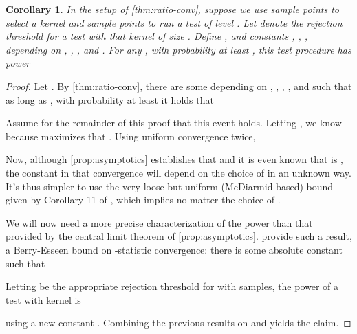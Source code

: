 \documentclass{article}
\newtheorem{corollary}[theorem]{Corollary} \crefname{corollary}{Corollary}{Corollaries}
\begin{document}
\begin{corollary} \label{thm:opt-power}
    In the setup of \cref{thm:ratio-conv},
    suppose we use  sample points to select a kernel 
    and  sample points to run a test of level .
    Let  denote the rejection threshold for a test with that kernel of size .
Define
    ,
    and constants , , ,  depending on , , ,  and .
    For any ,
    with probability at least ,
    this test procedure has power
    
\end{corollary}
\begin{proof}
    Let .
    By \cref{thm:ratio-conv},
    there are some  depending on , , , , and 
    such that as long as ,
    with probability at least  it holds that
    
    Assume for the remainder of this proof that this event holds.
    Letting ,
    we know because  maximizes  that .
Using uniform convergence twice,
    

    Now, although
    \cref{prop:asymptotics} establishes that  
    and it is even known \citep[Theorem 5]{Korolyuk1988} that
     is ,
the constant in that convergence will depend on the choice of  in an unknown way.
    It's thus simpler to use the very loose but uniform (McDiarmid-based) bound
    given by Corollary 11 of \citet{Gretton2012},
    which implies 
    no matter the choice of .

    We will now need a more precise characterization of the power than that provided by the
    central limit theorem of \cref{prop:asymptotics}.
     provide such a result, a Berry-Esseen bound on -statistic convergence:
    there is some absolute constant  such that
    
    Letting  be the appropriate rejection threshold for  with  samples,
the power of a test with kernel  is
    
    using a new constant .
    Combining the previous results on  and 
    yields the claim.
\end{proof}
\end{document}
